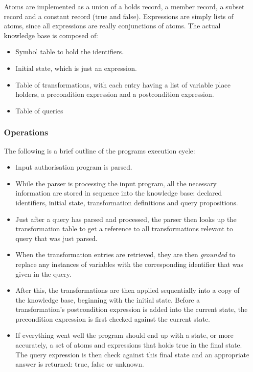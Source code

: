 \documentclass[a4paper]{article}
\begin{document}
        Atoms are implemented as a union of a holds record, a member record,
        a subset record and a constant record (true and false). Expressions
        are simply lists of atoms, since all expressions are really
        conjunctions of atoms. The actual knowledge base is composed of:

        \begin{itemize}
          \item
            Symbol table to hold the identifiers.
          \item
            Initial state, which is just an expression.
          \item
            Table of transformations, with each entry having a list of
            variable place holders, a precondition expression and a
            postcondition expression.
          \item
            Table of queries
        \end{itemize}

      \subsubsection{Operations}

        The following is a brief outline of the programs execution cycle:

        \begin{itemize}
          \item
            Input authorisation program is parsed.
          \item
            While the parser is processing the input program, all the
            necessary information are stored in sequence into the knowledge
            base: declared identifiers, initial state, transformation
            definitions and query propositions.
          \item
            Just after a query has parsed and processed, the parser then
            looks up the transformation table to get a reference to all
            transformations relevant to query that was just parsed.
          \item
            When the transformation entries are retrieved, they are then
            \emph{grounded} to replace any instances of variables with
            the corresponding identifier that was given in the query.
          \item
            After this, the transformations are then applied sequentially
            into a copy of the knowledge base, beginning with the initial
            state. Before a transformation's postcondition expression is added
            into the current state, the precondition expression is first
            checked against the current state.
          \item
            If everything went well the program should end up with a state,
            or more accurately, a set of atoms and expressions that holds
            true in the final state. The query expression is then check
            against this final state and an appropriate answer is returned:
            true, false or unknown.
            
        \end{itemize}
\end{document}
